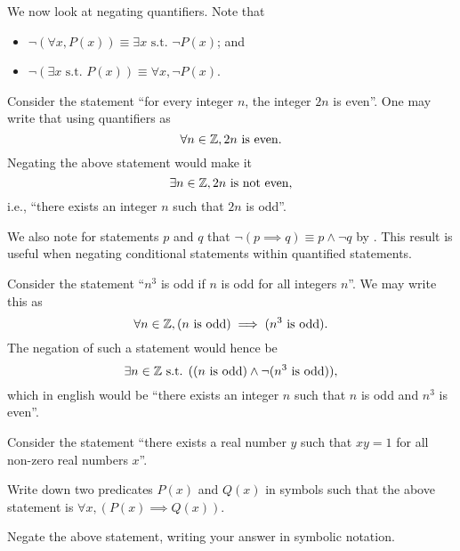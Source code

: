\newpage

We now look at negating quantifiers. Note that
\begin{itemize}
    \item $\lnot(\forall x, P(x)) \equiv \exists x \text{ s.t. } \lnot P(x)$; and
    \item $\lnot(\exists x \text{ s.t. } P(x)) \equiv \forall x, \lnot P(x)$.
\end{itemize}
\begin{example}
    Consider the statement ``for every integer $n$, the integer $2n$ is even''. One may write that using quantifiers as
    \[
        \forall n \in\mathbb{Z}, 2n \text{ is even}.
    \]
    Negating the above statement would make it
    \[
        \exists n \in \mathbb{Z}, 2n \text{ is not even},
    \]
    i.e., ``there exists an integer $n$ such that $2n$ is odd''.
\end{example}

We also note for statements $p$ and $q$ that $\lnot(p \implies q) \equiv p \land \lnot q$ by . This result is useful when negating conditional statements within quantified statements.

\begin{example}
    Consider the statement ``$n^3$ is odd if $n$ is odd for all integers $n$''. We may write this as
    \[
        \forall n \in \mathbb{Z}, (n \text{ is odd}) \implies (n^3 \text{ is odd}).
    \]
    The negation of such a statement would hence be
    \[
        \exists n \in \mathbb{Z} \text{ s.t. }((n \text{ is odd}) \land \lnot(n^3 \text{ is odd})),
    \]
    which in english would be ``there exists an integer $n$ such that $n$ is odd and $n^3$ is even''.
\end{example}

\begin{exercise}
    Consider the statement ``there exists a real number $y$ such that $xy = 1$ for all non-zero real numbers $x$''.
    \begin{partquestions}{\roman*}
        \item Write down two predicates $P(x)$ and $Q(x)$ in symbols such that the above statement is $\forall x,(P(x) \implies Q(x))$.
        \item Negate the above statement, writing your answer in symbolic notation.
    \end{partquestions}
\end{exercise}

